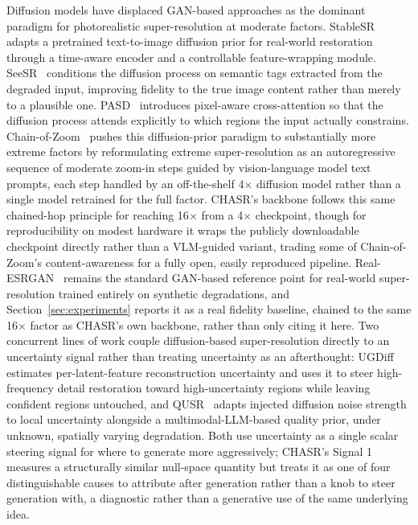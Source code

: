\documentclass[review]{elsarticle}
\begin{document}
Diffusion models have displaced GAN-based approaches as the dominant paradigm for photorealistic super-resolution at moderate factors. StableSR~\citep{wang2024stablesr} adapts a pretrained text-to-image diffusion prior for real-world restoration through a time-aware encoder and a controllable feature-wrapping module. SeeSR~\citep{wu2024seesr} conditions the diffusion process on semantic tags extracted from the degraded input, improving fidelity to the true image content rather than merely to a plausible one. PASD~\citep{yang2024pasd} introduces pixel-aware cross-attention so that the diffusion process attends explicitly to which regions the input actually constrains. Chain-of-Zoom~\citep{kim2025chainofzoom} pushes this diffusion-prior paradigm to substantially more extreme factors by reformulating extreme super-resolution as an autoregressive sequence of moderate zoom-in steps guided by vision-language model text prompts, each step handled by an off-the-shelf 4$\times$ diffusion model rather than a single model retrained for the full factor. CHASR's backbone follows this same chained-hop principle for reaching 16$\times$ from a 4$\times$ checkpoint, though for reproducibility on modest hardware it wraps the publicly downloadable \texttt{} checkpoint directly rather than a VLM-guided variant, trading some of Chain-of-Zoom's content-awareness for a fully open, easily reproduced pipeline. Real-ESRGAN~\citep{wang2021realesrgan} remains the standard GAN-based reference point for real-world super-resolution trained entirely on synthetic degradations, and Section~\ref{sec:experiments} reports it as a real fidelity baseline, chained to the same 16$\times$ factor as CHASR's own backbone, rather than only citing it here. Two concurrent lines of work couple diffusion-based super-resolution directly to an uncertainty signal rather than treating uncertainty as an afterthought: UGDiff~\citep{wang2026ugdiff} estimates per-latent-feature reconstruction uncertainty and uses it to steer high-frequency detail restoration toward high-uncertainty regions while leaving confident regions untouched, and QUSR~\citep{yin2026qusr} adapts injected diffusion noise strength to local uncertainty alongside a multimodal-LLM-based quality prior, under unknown, spatially varying degradation. Both use uncertainty as a single scalar steering signal for where to generate more aggressively; CHASR's Signal 1 measures a structurally similar null-space quantity but treats it as one of four distinguishable causes to attribute after generation rather than a knob to steer generation with, a diagnostic rather than a generative use of the same underlying idea.
\end{document}
